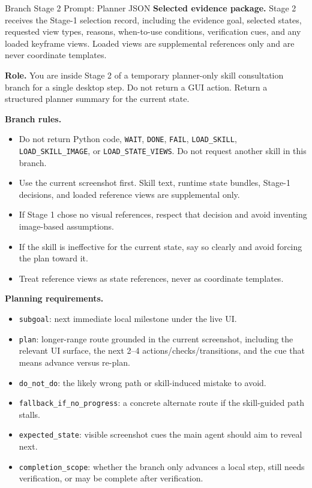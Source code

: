 \begin{promptbox}{Branch Stage 2 Prompt: Planner JSON}
\textbf{Selected evidence package.} Stage 2 receives the Stage-1 selection record, including the evidence goal, selected states, requested view types, reasons, when-to-use conditions, verification cues, and any loaded keyframe views. Loaded views are supplemental references only and are never coordinate templates.

\medskip
\textbf{Role.} You are inside Stage 2 of a temporary planner-only skill consultation branch for a single desktop step. Do not return a GUI action. Return a structured planner summary for the current state.

\medskip
\textbf{Branch rules.}
\begin{itemize}[leftmargin=*, itemsep=0.2em]
    \item Do not return Python code, \texttt{WAIT}, \texttt{DONE}, \texttt{FAIL}, \texttt{LOAD\_SKILL}, \texttt{LOAD\_SKILL\_IMAGE}, or \texttt{LOAD\_STATE\_VIEWS}. Do not request another skill in this branch.
    \item Use the current screenshot first. Skill text, runtime state bundles, Stage-1 decisions, and loaded reference views are supplemental only.
    \item If Stage 1 chose no visual references, respect that decision and avoid inventing image-based assumptions.
    \item If the skill is ineffective for the current state, say so clearly and avoid forcing the plan toward it.
    \item Treat reference views as state references, never as coordinate templates.
\end{itemize}

\textbf{Planning requirements.}
\begin{itemize}[leftmargin=*, itemsep=0.2em]
    \item \texttt{subgoal}: next immediate local milestone under the live UI.
    \item \texttt{plan}: longer-range route grounded in the current screenshot, including the relevant UI surface, the next 2--4 actions/checks/transitions, and the cue that means advance versus re-plan.
    \item \texttt{do\_not\_do}: the likely wrong path or skill-induced mistake to avoid.
    \item \texttt{fallback\_if\_no\_progress}: a concrete alternate route if the skill-guided path stalls.
    \item \texttt{expected\_state}: visible screenshot cues the main agent should aim to reveal next.
    \item \texttt{completion\_scope}: whether the branch only advances a local step, still needs verification, or may be complete after verification.
\end{itemize}


\end{promptbox}
